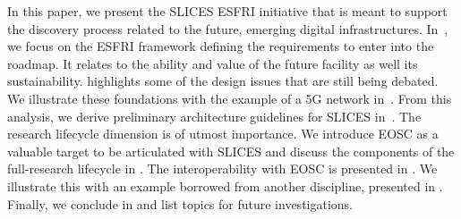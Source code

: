 %	


In this paper, we present the SLICES ESFRI initiative that is meant to support the discovery process related to the future, emerging digital infrastructures. In~, we focus on the ESFRI framework defining the requirements to enter into the roadmap. It relates to the ability and value of the future facility as well its sustainability.  highlights some of the design issues that are still being debated. We illustrate these foundations with the example of a 5G network in~. From this analysis, we derive preliminary architecture guidelines for SLICES in~. The research lifecycle dimension is of utmost importance. We introduce EOSC as a valuable target to be articulated with SLICES and discuss the components of the full-research lifecycle in . The interoperability with EOSC is presented in . We illustrate this with an example borrowed from another discipline, presented in . Finally, we conclude in  and list topics for future investigations.

